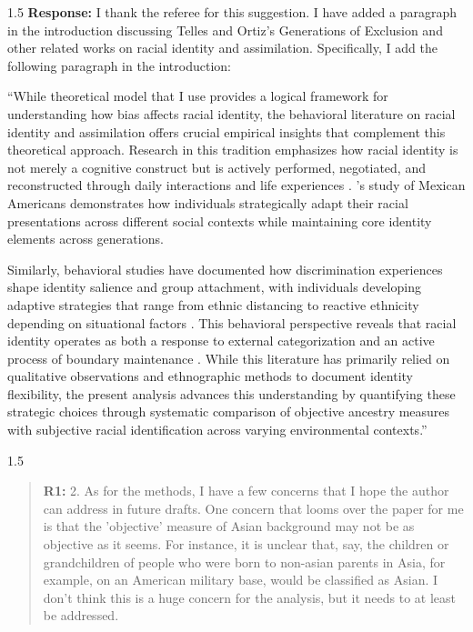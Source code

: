 \documentclass[12pt,english]{article}
\newcommand{\rrxspc}{1.5}
\begin{document}
\begin{refsection}
    \begin{spacing}{\rrxspc}
        \textbf{Response:} I thank the referee for this suggestion. I have added a paragraph in the introduction discussing Telles and Ortiz's Generations of Exclusion and other related works on racial identity and assimilation. Specifically, I add the following paragraph in the introduction: 

        ``While \textcite{akerlofEconomicsIdentity2000} theoretical model that I use provides a logical framework for understanding how bias affects racial identity, the behavioral literature on racial identity and assimilation offers crucial empirical insights that complement this theoretical approach. Research in this tradition emphasizes how racial identity is not merely a cognitive construct but is actively performed, negotiated, and reconstructed through daily interactions and life experiences \autocite{waters1990ethnic}. \textcite{telles2008generations}'s study of Mexican Americans demonstrates how individuals strategically adapt their racial presentations across different social contexts while maintaining core identity elements across generations. 

        Similarly, behavioral studies have documented how discrimination experiences shape identity salience and group attachment, with individuals developing adaptive strategies that range from ethnic distancing to reactive ethnicity depending on situational factors \autocite{zhou1997segmented}. This behavioral perspective reveals that racial identity operates as both a response to external categorization and an active process of boundary maintenance \autocite{cornell2006ethnicity}. While this literature has primarily relied on qualitative observations and ethnographic methods to document identity flexibility, the present analysis advances this understanding by quantifying these strategic choices through systematic comparison of objective ancestry measures with subjective racial identification across varying environmental contexts.''
    \end{spacing}
    
    \begin{spacing}{\rrxspc}
    \begin{quotation}
        \textbf{R1: } 2. As for the methods, I have a few concerns that I hope the author can address in future drafts. One concern that looms over the paper for me is that the 'objective' measure of Asian background may not be as objective as it seems. For instance, it is unclear that, say, the children or grandchildren of people who were born to non-asian parents in Asia, for example, on an American military base, would be classified as Asian. I don't think this is a huge concern for the analysis, but it needs to at least be addressed.
        \end{quotation}
        \end{spacing}
        

\end{refsection}
\end{document}
